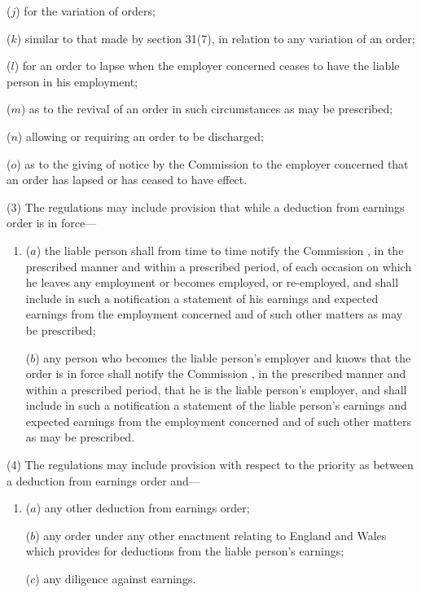 \documentclass[12pt,a4paper]{article}
\begin{document}
\begin{enumerate}
($j$) for the variation of orders;

($k$) similar to that made by section 31(7), in relation to any variation of an order;

($l$) for an order to lapse when the employer concerned ceases to have the liable person in his employment;

($m$) as to the revival of an order in such circumstances as may be prescribed;

($n$) allowing or requiring an order to be discharged;

($o$) as to the giving of notice by the 
Commission  %
to the employer concerned that an order has lapsed or has ceased to have effect.
\end{enumerate}

(3) The regulations may include provision that while a deduction from earnings order is in force—
\begin{enumerate}\item[]
($a$) the liable person shall from time to time notify the 
Commission%
, in the prescribed manner and within a prescribed period, of each occasion on which he leaves any employment or becomes employed, or re-employed, and shall include in such a notification a statement of his earnings and expected earnings from the employment concerned and of such other matters as may be prescribed;

($b$) any person who becomes the liable person’s employer and knows that the order is in force shall notify the 
Commission%
, in the prescribed manner and within a prescribed period, that he is the liable person’s employer, and shall include in such a notification a statement of the liable person’s earnings and expected earnings from the employment concerned and of such other matters as may be prescribed.
\end{enumerate}

(4) The regulations may include provision with respect to the priority as between a deduction from earnings order and—
\begin{enumerate}\item[]
($a$) any other deduction from earnings order;

($b$) any order under any other enactment relating to England and Wales which provides for deductions from the liable person’s earnings;

($c$) any diligence against earnings.
\end{enumerate}
\end{document}
